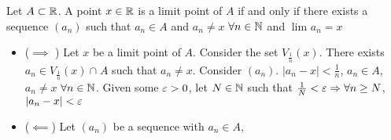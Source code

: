 \begin{theorem}
	Let $A \subset \mathbb{R}$. A point $x \in \mathbb{R}$ is a limit point of $A$ if and only if there exists a sequence $\left( a_n \right) $ such that $a_n \in A$ and $a_n \neq x$ $\forall n \in \mathbb{N}$ and $\lim_{} a_n = x$
	\begin{itemize}
		\item ($\implies$ ) Let $x$ be a limit point of $A$. Consider the set $V_{\frac{1}{n}}\left( x \right) $. There exists $a_n \in V_{\frac{1}{n}}\left( x \right) \cap_{}^{} A$ such that $a_n \neq x$. Consider $\left( a_n \right) $. $\left|a_n - x\right| < \frac{1}{n}$, $a_n \in A$, $a_n \neq x$ $\forall n \in \mathbb{N}$. Given some $\e > 0$, let $N \in \mathbb{N}$ such that $\frac{1}{N} < \e \implies \forall n \ge N$, $\left|a_n - x\right| < \e$
		\item ($\impliedby$) Let $\left( a_n \right) $ be a sequence with $a_n \in A$, 
	\end{itemize}
\end{theorem}

